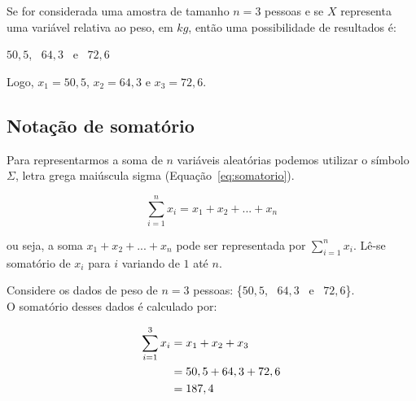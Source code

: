 \documentclass[11pt,fleqn]{book} %
\begin{document}
\begin{example} \label{exemp:varIndices}
Se for considerada uma amostra de tamanho $n=3$ pessoas e se $X$ representa uma variável relativa ao peso, em $kg$, então uma possibilidade de resultados é:

\begin{center}
	$50,5$, \, $64,3$ \, e \, $72,6$
\end{center}

Logo, $x_1=50,5$, $x_2=64,3$ e $x_3=72,6$.
\end{example}
\vspace{0.5cm}



\subsection{Notação de somatório}
\vspace{0,3cm}

Para representarmos a soma de $n$ variáveis aleatórias podemos utilizar o símbolo $\Sigma$, letra grega maiúscula sigma (Equação~\ref{eq:somatorio}).

\begin{eBox}
\vspace{-0.5cm}
\begin{equation} \label{eq:somatorio}
		\displaystyle 	\sum_{i=1}^{n}x_i=x_1+x_2+...+x_n
\end{equation}
\end{eBox}

\noindent ou seja, a soma $x_1+x_2+...+x_n$ pode ser representada por $\displaystyle \sum_{i=1}^{n}x_i$.  Lê-se somatório de $x_i$ para $i$ variando de $1$ até $n$.\\



\begin{example} \label{exemp:somatorio}
	Considere os dados de peso de $n=3$ pessoas: \{$50,5$, \, $64,3$ \, e \, $72,6$\}.\\

	O somatório desses dados é calculado por:

	\begin{ceqn}
	\begin{align*}
	\centering
	\sum_{i=1}^{3}x_i 	
	&= x_1+x_2+x_3 \\
    &= 50,5+64,3+72,6 \\
    &= 187,4
	\end{align*}
	\end{ceqn}

	
\end{example}
\vspace{0.5cm}
\end{document}
